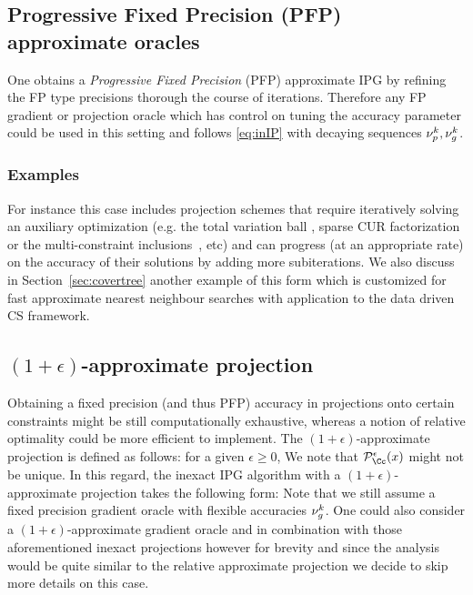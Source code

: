 \subsection{Progressive Fixed Precision (PFP) approximate oracles}\label{sec:PFP}
One obtains a \emph{Progressive Fixed Precision} (PFP) approximate IPG by refining the FP type precisions thorough the course of iterations. Therefore any FP gradient or projection oracle which has control on tuning the accuracy parameter could be used in this setting and follows \eqref{eq:inIP} with decaying sequences $\nu_p^k,\nu_g^k$.
\subsubsection*{Examples}
For instance this case includes projection schemes that require iteratively solving an auxiliary optimization (e.g. the total variation ball \cite{TVprojGabirel}, sparse CUR factorization \cite{BachinexactIPG} or the multi-constraint inclusions~\cite{Dykstra,Dykstra2}, etc) and can progress (at an appropriate rate) on the accuracy of their solutions by adding more subiterations. We also discuss in Section~\ref{sec:covertree} another example 
of this form which is customized for fast approximate nearest neighbour searches with  
application to the data driven CS framework.

\subsection{$(1+\epsilon)$-approximate projection}\label{sec:epsproj}
Obtaining a fixed precision (and thus PFP) accuracy in  projections onto certain constraints might be still computationally exhaustive, whereas a notion of relative optimality 
could be more efficient to implement. The $(1+\epsilon)$-approximate projection is defined as follows: for a given $\epsilon\geq0$,
We note that $\pp_\Cc^{\epsilon}(x)$ might not be unique. In this regard, the inexact IPG algorithm with a $(1+\epsilon)$-approximate projection takes the following form:
Note that we still assume a fixed precision gradient oracle with flexible accuracies $\nu_g^k$.  
One could also consider a $(1+\epsilon)$-approximate gradient oracle and in combination with those aforementioned inexact projections however for brevity and since the analysis would be quite  similar to the relative approximate projection we decide to skip more details on this case. %
